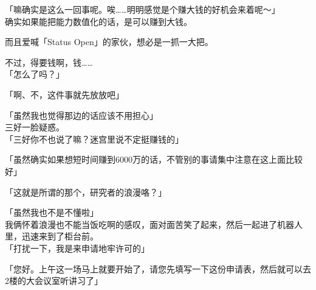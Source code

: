 「嘛确实是这么一回事呢。唉……明明感觉是个赚大钱的好机会来着呢～」\\

确实如果能把能力数值化的话，是可以赚到大钱。

而且爱喊「Status Open」的家伙，想必是一抓一大把。

不过，得要钱啊，钱……\\

「怎么了吗？」

「啊、不，这件事就先放放吧」

「虽然我也觉得那边的话应该不用担心」\\

三好一脸疑惑。\\

「三好你不也说了嘛？迷宫里说不定挺赚钱的」

「虽然确实如果想短时间赚到6000万的话，不管别的事请集中注意在这上面比较好」

「这就是所谓的那个，研究者的浪漫咯？」

「虽然我也不是不懂啦」\\

我俩怀着浪漫也不能当饭吃啊的感叹，面对面苦笑了起来，然后一起进了机器人里，迅速来到了柜台前。\\

「打扰一下，我是来申请地牢许可的」

「您好。上午这一场马上就要开始了，请您先填写一下这份申请表，然后就可以去2楼的大会议室听讲习了」

